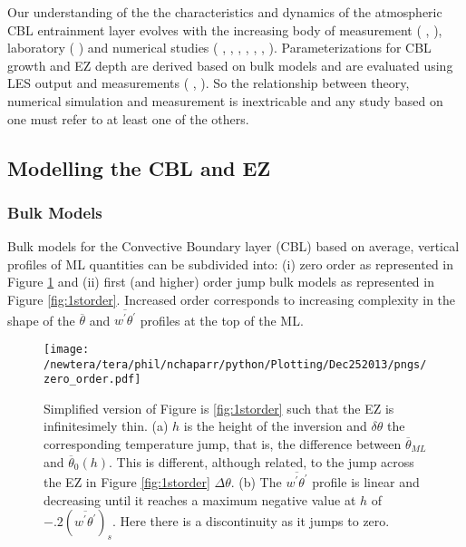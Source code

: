 Our understanding of the the characteristics and dynamics of the atmospheric \acs{CBL} entrainment layer evolves with the increasing body of measurement (\citeauthor{Traum11} \citeyear{Traum11}, \citeauthor{StullNelEl} \citeyear{StullNelEl}), laboratory (\citeauthor{DearWill80} \citeyear{DearWill80}) and numerical studies (\citeauthor{Deardorff72} \citeyear{Deardorff72}, \citeauthor{Sorbjan1} \citeyear{Sorbjan1}, \citeauthor{SullMoengStev} \citeyear{SullMoengStev}, \citeauthor{EbSchu} \citeyear{EbSchu}, \citeauthor{FedConzMir04} \citeyear{FedConzMir04}, \citeauthor{BrooksFowler2} \citeyear{BrooksFowler2}, \citeauthor{GarciaMellado} \citeyear{GarciaMellado}). Parameterizations for \acs{CBL} growth and \acs{EZ} depth are derived based on bulk models and are evaluated using \acs{LES} output and measurements (\citeauthor{FedConzMir04} \citeyear{FedConzMir04}, \citeauthor{Boers89} \citeyear{Boers89}).  So the relationship between theory, numerical simulation and measurement is inextricable and any study based on one must refer to at least one of the others.\\  

\subsection{Modelling the CBL and EZ}
\label{subsec:}

\subsubsection{Bulk Models}
\label{subsubsec:}
Bulk  models for the Convective Boundary layer (\acs{CBL}) based on average, vertical profiles of \acs{ML} quantities can be subdivided into: (i) zero order as represented in Figure \ref{fig:0order} and (ii) first (and higher) order jump bulk models as represented in Figure \ref{fig:1storder}.  Increased order corresponds to increasing complexity in the shape of the  $\overline{\theta}$ and $\overline{w^{'}\theta^{'}}$ profiles at the top of the \acs{ML}.\\

\begin{figure}[htbp]
    \centering
    \texttt{[image: /newtera/tera/phil/nchaparr/python/Plotting/Dec252013/pngs/zero\_order.pdf]}
    \caption[Zero order jump representation of the \acs{CBL}]{Simplified version of Figure is \ref{fig:1storder} such that the \acs{EZ} is infinitesimely thin. (a) $h$ is the height of the  inversion and $\delta \theta$ the corresponding temperature jump, that is, the difference between $\overline{\theta}_{ML}$ and $\overline{\theta}_{0}(h)$. This is different, although related, to the jump across the \acs{EZ} in Figure \ref{fig:1storder} $\Delta \theta$. (b) The $\overline{w^{'}\theta^{'}}$ profile is linear and decreasing until it reaches a maximum negative value at $h$ of $-.2(\overline{w^{'}\theta^{'}})_{s}$. Here there is a discontinuity as it jumps to zero.}
    \label{fig:0order}   %
\end{figure}

